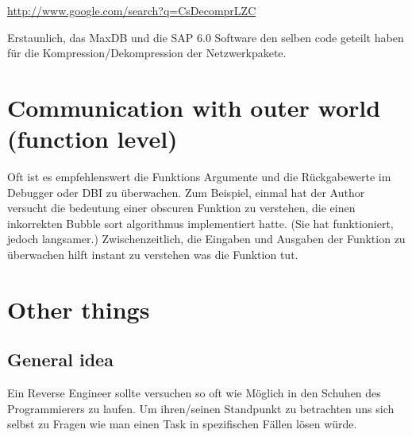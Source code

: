 \url{http://www.google.com/search?q=CsDecomprLZC}

Erstaunlich, das MaxDB und die SAP 6.0 Software den selben code geteilt haben für die Kompression/Dekompression der Netzwerkpakete.




\section{Communication with outer world (function level)}
Oft ist es empfehlenswert die Funktions Argumente und die Rückgabewerte im Debugger oder \ac{DBI} zu überwachen.
Zum Beispiel, einmal hat der Author versucht die bedeutung einer obscuren Funktion zu verstehen, die einen inkorrekten
Bubble sort algorithmus implementiert hatte. (Sie hat funktioniert, jedoch langsamer.) 
Zwischenzeitlich, die Eingaben und Ausgaben der Funktion zu überwachen hilft instant zu verstehen was die Funktion tut.










\section{Other things}

\subsection{General idea}

Ein Reverse Engineer sollte versuchen so oft wie Möglich in den Schuhen des Programmierers zu laufen.
Um ihren/seinen Standpunkt zu betrachten uns sich selbst zu Fragen wie man einen Task in spezifischen Fällen lösen würde.

